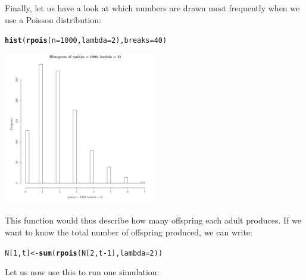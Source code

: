 \documentclass{article}\usepackage[]{graphicx}\usepackage[]{color}
\makeatletter
\newcommand{\hlnum}[1]{\textcolor[rgb]{0.686,0.059,0.569}{#1}}%
\newcommand{\hlopt}[1]{\textcolor[rgb]{0,0,0}{#1}}%
\newcommand{\hlstd}[1]{\textcolor[rgb]{0.345,0.345,0.345}{#1}}%
\newcommand{\hlkwb}[1]{\textcolor[rgb]{0.69,0.353,0.396}{#1}}%
\newcommand{\hlkwc}[1]{\textcolor[rgb]{0.333,0.667,0.333}{#1}}%
\newcommand{\hlkwd}[1]{\textcolor[rgb]{0.737,0.353,0.396}{\textbf{#1}}}%
\newenvironment{kframe}{%
 \def\at@end@of@kframe{}%
 \ifinner\ifhmode%
  \def\at@end@of@kframe{\end{minipage}}%
  \begin{minipage}{\columnwidth}%
 \fi\fi%
 \def\FrameCommand##1{\hskip\@totalleftmargin \hskip-\fboxsep
 \colorbox{shadecolor}{##1}\hskip-\fboxsep
     \hskip-\linewidth \hskip-\@totalleftmargin \hskip\columnwidth}%
 \MakeFramed {\advance\hsize-\width
   \@totalleftmargin\z@ \linewidth\hsize
   \@setminipage}}%
 {\par\unskip\endMakeFramed%
 \at@end@of@kframe}
\newenvironment{knitrout}{}{} %
\makeatother
\begin{document}
Finally, let us have a look at which numbers are drawn most frequently when we use a Poisson distribution:
\begin{knitrout}
\color{fgcolor}\begin{kframe}
\begin{alltt}
\hlkwd{hist}\hlstd{(}\hlkwd{rpois}\hlstd{(}\hlkwc{n}\hlstd{=}\hlnum{1000}\hlstd{,}\hlkwc{lambda}\hlstd{=}\hlnum{2}\hlstd{),}\hlkwc{breaks}\hlstd{=}\hlnum{40}\hlstd{)}
\end{alltt}
\end{kframe}

{\centering \includegraphics[width=0.5\textwidth]{figure/dice7-1} 

}



\end{knitrout}
This function would thus describe how many offspring each adult produces. If we want to know the total number of offspring produced, we can write:
\begin{knitrout}
\color{fgcolor}\begin{kframe}
\begin{alltt}
\hlstd{N[}\hlnum{1}\hlstd{,t]}\hlkwb{<-}\hlkwd{sum}\hlstd{(}\hlkwd{rpois}\hlstd{(N[}\hlnum{2}\hlstd{,t}\hlopt{-}\hlnum{1}\hlstd{],}\hlkwc{lambda}\hlstd{=}\hlnum{2}\hlstd{))}
\end{alltt}
\end{kframe}
\end{knitrout}
Let us now use this to run one simulation:
\end{document}
